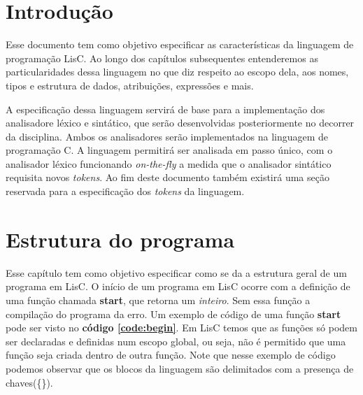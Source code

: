 \documentclass[
  12pt,				%
  oneside,			%
  a4paper,			%
  english,			%
  french,				%
  spanish,			%
  brazil,				%
]{abntex2}
\begin{document}
\frenchspacing 



\imprimirfolhaderosto*


\tableofcontents*

\textual
\chapter{Introdução}
\label{cha:intro}
Esse documento tem como objetivo especificar as características da
linguagem de programação LisC. Ao longo dos capítulos subsequentes
entenderemos as particularidades dessa linguagem no que diz respeito
ao escopo dela, aos nomes, tipos e estrutura de dados, atribuições,
expressões e mais.

A especificação dessa linguagem servirá de base para a implementação
dos analisadore léxico e sintático, que serão desenvolvidas
posteriormente no decorrer da disciplina. Ambos os analisadores serão
implementados na linguagem de programação C. A linguagem permitirá ser
analisada em passo único, com o analisador léxico funcionando
\textit{on-the-fly} a medida que o analisador sintático requisita novos
\textit{tokens}. Ao fim deste documento também existirá uma seção reservada
para a especificação dos \textit{tokens} da linguagem.




\chapter{Estrutura do programa}
\label{cha:estrutura-do-programa}
Esse capítulo tem como objetivo especificar como se da a estrutura
geral de um programa em LisC. O início de um programa em LisC ocorre
com a definição de uma função chamada \textbf{start}, que retorna um
\emph{inteiro}. Sem essa função a compilação do programa da erro. Um
exemplo de código de uma função \textbf{start} pode ser visto no
\textbf{código \ref{code:begin}}.
Em LisC temos que as funções só podem ser declaradas e definidas num
escopo global, ou seja, não é permitido que uma função seja criada
dentro de outra função. Note que nesse exemplo de código podemos
observar que os blocos da linguagem são delimitados com a presença
de chaves(\{\}).
\end{document}
